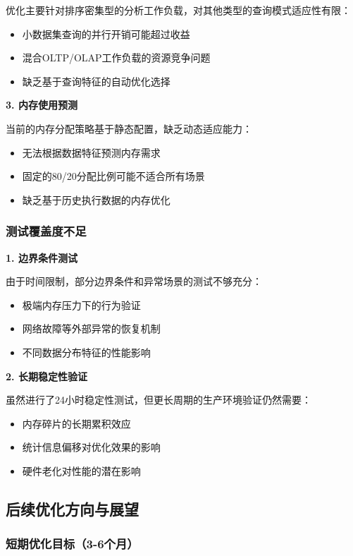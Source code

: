 优化主要针对排序密集型的分析工作负载，对其他类型的查询模式适应性有限：
\begin{itemize}
    \item 小数据集查询的并行开销可能超过收益
    \item 混合OLTP/OLAP工作负载的资源竞争问题
    \item 缺乏基于查询特征的自动优化选择
\end{itemize}

\textbf{3. 内存使用预测}

当前的内存分配策略基于静态配置，缺乏动态适应能力：
\begin{itemize}
    \item 无法根据数据特征预测内存需求
    \item 固定的80/20分配比例可能不适合所有场景
    \item 缺乏基于历史执行数据的内存优化
\end{itemize}

\subsubsection{测试覆盖度不足}

\textbf{1. 边界条件测试}

由于时间限制，部分边界条件和异常场景的测试不够充分：
\begin{itemize}
    \item 极端内存压力下的行为验证
    \item 网络故障等外部异常的恢复机制
    \item 不同数据分布特征的性能影响
\end{itemize}

\textbf{2. 长期稳定性验证}

虽然进行了24小时稳定性测试，但更长周期的生产环境验证仍然需要：
\begin{itemize}
    \item 内存碎片的长期累积效应
    \item 统计信息偏移对优化效果的影响
    \item 硬件老化对性能的潜在影响
\end{itemize}

\subsection{后续优化方向与展望}

\subsubsection{短期优化目标（3-6个月）}

